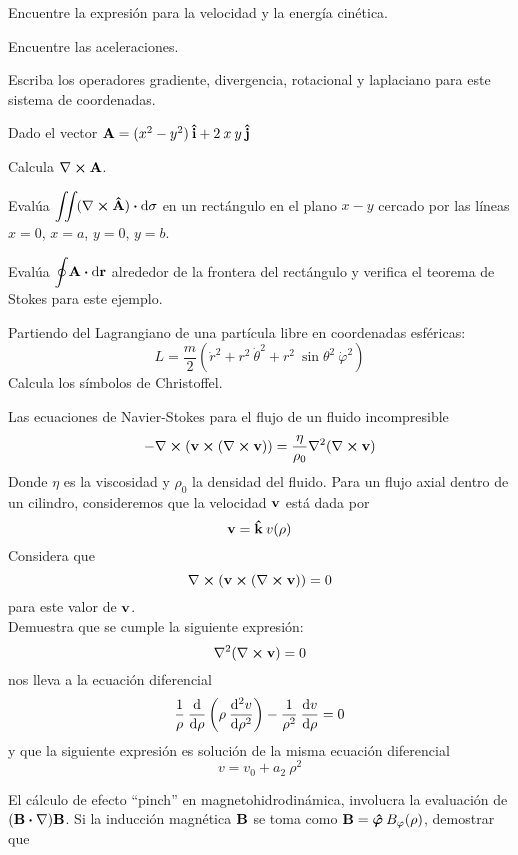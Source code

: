 \documentclass[12pt]{article}
\begin{document}
\begin{milista}
\begin{milista}
\item Encuentre la expresión para la velocidad y la energía cinética.
\item Encuentre las aceleraciones.
\item Escriba los operadores gradiente, divergencia, rotacional y laplaciano para este sistema de coordenadas.
\end{milista}
\item Dado el vector $\vb{A} = (x^{2} - y^{2}) \: \vu{i} + 2 \: x \: y \: \vu{j}$
\begin{milista}
\item Calcula $\vb{\nabla} \cp \vb{A}$.
\item Evalúa $\mathlarger{\iint} (\vb{\nabla} \cp \vu{A}) \vdot \dd{\sigma} $ en un rectángulo en el plano $x-y$ cercado por las líneas $x=0$, $x=a$, $y=0$, $y=b$.
\item Evalúa $\mathlarger{\oint} \vb{A} \vdot \dd{\vb{r}}$ alrededor de la frontera del rectángulo y verifica el teorema de Stokes para este ejemplo.
\end{milista}
\item Partiendo del Lagrangiano de una partícula libre en coordenadas esféricas:
\[ L = \dfrac{m}{2} \left( \dot{r}^{2} + r^{2} \: \dot{\theta}^{2} + r^{2} \: \sin \theta^{2} \: \dot{\varphi}^{2} \right)\]
Calcula los símbolos de Christoffel.
\item Las ecuaciones de Navier-Stokes para el flujo de un fluido incompresible
\[ - \vb{\nabla} \cp ( \vb{v} \cp (\vb{\nabla} \cp \vb{v} )) =  \dfrac{\eta}{\rho_{0}} \vb{\nabla}^{2} (\vb{\nabla} \cp \vb{v}) \]
Donde $\eta$ es la viscosidad y $\rho_{0}$ la densidad del fluido. Para un flujo axial dentro de un cilindro, consideremos que la velocidad $\vb{v}$ está dada por
\[ \vb{v} =  \vu{k} \: v (\rho) \]
Considera que
\[ \vb{\nabla} \cp (\vb{v} \cp (\vb{\nabla} \cp \vb{v})) = 0 \]
para este valor de $\vb{v}$.
\\
Demuestra que se cumple la siguiente expresión:
\[ \vb{\nabla}^{2} ( \vb{\nabla} \cp \vb{v}) = 0  \]
nos lleva a la ecuación diferencial
\[ \dfrac{1}{\rho} \: \dv{\rho} \left( \rho \: \dv[2]{v}{\rho} \right) -  \dfrac{1}{\rho^{2}} \: \dv{v}{\rho} = 0 \]
y que la siguiente expresión es solución de la misma ecuación diferencial
\[ v = v_{0} + a_{2} \: \rho^{2} \]
\item El cálculo de efecto \enquote{pinch} en magnetohidrodinámica, involucra la evaluación de $(\vb{B} \vdot \vb{\nabla}) \vb{B}$. Si la inducción magnética $\vb{B}$ se toma como $\vb{B} = \vu*{\varphi} \: B_{\varphi} (\rho)$, demostrar que

\end{milista}
\end{document}
